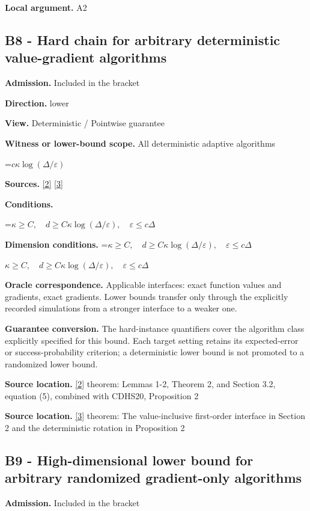 \documentclass[10pt,a4paper]{article}
\newcommand{\AtlasMath}[1]{\par\begingroup\centering\setbox0=\hbox{$\displaystyle #1$}\ifdim\wd0>1.4\linewidth\typeout{ATLAS WIDE FORMULA: \the\wd0}\fi\ifdim\wd0>\linewidth\resizebox{\linewidth}{!}{\box0}\else\box0\fi\par\endgroup}
\newcommand{\AtlasInlineMath}[1]{\begingroup\setbox0=\hbox{$#1$}\ifdim\wd0>.4\linewidth\endgroup\AtlasMath{#1}\else\endgroup$#1$\fi}
\begin{document}
\textbf{Local argument.} A2

\subsection{B8 - Hard chain for arbitrary deterministic value-gradient algorithms}
\textbf{Admission.} Included in the bracket

\textbf{Direction.} lower

\textbf{View.} Deterministic / Pointwise guarantee

\textbf{Witness or lower-bound scope.} All deterministic adaptive algorithms

\AtlasMath{c\kappa\log(\Delta/\varepsilon)}
\textbf{Sources.} \href{https://arxiv.org/pdf/2212.13551}{[2]} \href{https://arxiv.org/pdf/1710.11606}{[3]}

\textbf{Conditions.} 
\AtlasMath{\kappa\ge C,\quad d\ge C\kappa\log(\Delta/\varepsilon),\quad\varepsilon\le c\Delta}


\textbf{Dimension conditions.} \AtlasInlineMath{\kappa\ge C,\quad d\ge C\kappa\log(\Delta/\varepsilon),\quad\varepsilon\le c\Delta}

\textbf{Oracle correspondence.} Applicable interfaces: exact function values and gradients, exact gradients. Lower bounds transfer only through the explicitly recorded simulations from a stronger interface to a weaker one.

\textbf{Guarantee conversion.} The hard-instance quantifiers cover the algorithm class explicitly specified for this bound. Each target setting retains its expected-error or success-probability criterion; a deterministic lower bound is not promoted to a randomized lower bound.

\textbf{Source location.} \href{https://arxiv.org/pdf/2212.13551}{[2]} theorem: Lemmas 1-2, Theorem 2, and Section 3.2, equation (5), combined with CDHS20, Proposition 2

\textbf{Source location.} \href{https://arxiv.org/pdf/1710.11606}{[3]} theorem: The value-inclusive first-order interface in Section 2 and the deterministic rotation in Proposition 2

\subsection{B9 - High-dimensional lower bound for arbitrary randomized gradient-only algorithms}
\textbf{Admission.} Included in the bracket
\end{document}

